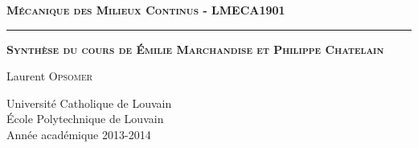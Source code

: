 

\begin{titlepage}

\begin{center}

\textsc{\LARGE \textbf{Mécanique des Milieux Continus - LMECA1901}}
\vspace{0,3cm}
\hrule 
\vspace{0,3cm}
 

\textsc{\LARGE \textbf{Synthèse du cours de \'Emilie \textsc{Marchandise} et Philippe \textsc{Chatelain}}}

 
\vspace{0,7cm}

 Laurent \textsc{Opsomer} \\
 
\vspace{0.5cm}

\vfill{
Université Catholique de Louvain\\ \'Ecole Polytechnique de Louvain\\
Année académique 2013-2014}

\end{center}

\end{titlepage}